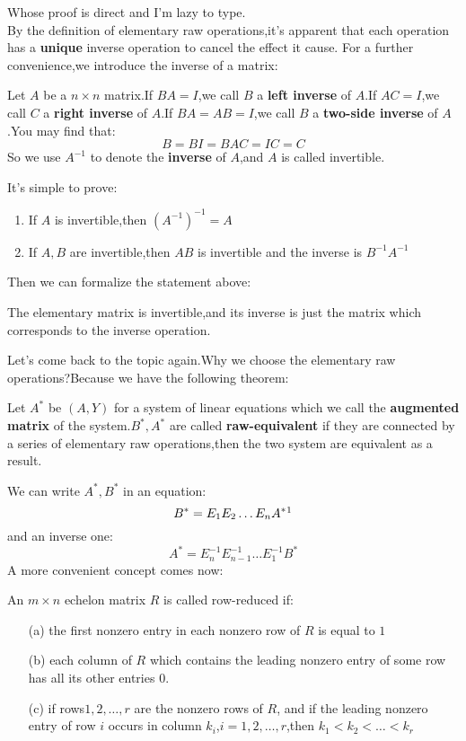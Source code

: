 \documentclass{article}
\begin{document}
Whose proof is direct and I'm lazy to type.\\
\indent By the definition of elementary raw operations,it's apparent that each operation has a \textbf{unique} inverse operation to cancel the effect it cause. 
\indent For a further convenience,we introduce the inverse of a matrix:
\begin{dde}
	Let $A$ be a $n\times n$ matrix.If $BA=I$,we call $B$ a \textbf{left inverse} of $A$.If $AC=I$,we call $C$ a \textbf{right inverse} of $A$.If $BA=AB=I$,we call $B$ a \textbf{two-side inverse} of $A$.You may find that:\[B=BI=BAC=IC=C\]So we use $A^{-1}$ to denote the \textbf{inverse} of $A$,and $A$ is called invertible.
\end{dde}
It's simple to prove:
\begin{thm}
\begin{enumerate}
	\item If $A$ is invertible,then $(A^{-1})^{-1}=A$
	\item If $A,B$ are invertible,then $AB$ is invertible and the inverse is $B^{-1}A^{-1}$ 
\end{enumerate}
\end{thm}
Then we can formalize the statement above:
\begin{thm}
	The elementary matrix is invertible,and its inverse is just the matrix which corresponds to the inverse operation.
\end{thm}
Let's come back to the topic again.Why we choose the elementary raw operations?Because we have the following theorem:
\begin{thm}
	Let $A^*$ be $(A,Y)$ for a system of linear equations which we call the \textbf{augmented matrix} of the system.$B^*,A^*$ are called \textbf{raw-equivalent} if they are connected by a series of elementary raw operations,then the two system are equivalent as a result.
\end{thm}
We can write $A^*,B^*$ in an equation:\[B^*=E_1E_2\dots E_nA^*\footnote{the foot scripts here don't mean the dimension}\]
and an inverse one:\[A^*=E_n^{-1}E_{n-1}^{-1}\dots E_1^{-1}B^*\]
\indent A more convenient concept comes now:
\begin{dde}
	An $m\times n$ echelon matrix $R$ is called row-reduced if:
	\begin{enumerate}
		\item[(a)] the first nonzero entry in each nonzero row of $R$ is equal to $1$
		\item[(b)] each column of $R$ which contains the leading nonzero entry of some row has all its other entries $0$.
		\item[(c)] if rows$1,2,\dots,r$ are the nonzero rows of $R$, and if the leading nonzero entry of row $i$ occurs in column $k_i$,$i=1,2,\dots,r$,then $k_1<k_2<\dots<k_r$
	\end{enumerate}
\end{dde}
\end{document}
